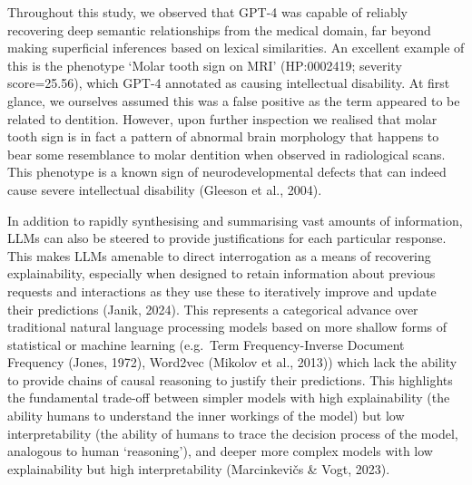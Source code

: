 \documentclass[
]{agujournal2019}
\begin{document}
Throughout this study, we observed that GPT-4 was capable of reliably
recovering deep semantic relationships from the medical domain, far
beyond making superficial inferences based on lexical similarities. An
excellent example of this is the phenotype `Molar tooth sign on MRI'
(HP:0002419; severity score=25.56), which GPT-4 annotated as causing
intellectual disability. At first glance, we ourselves assumed this was
a false positive as the term appeared to be related to dentition.
However, upon further inspection we realised that molar tooth sign is in
fact a pattern of abnormal brain morphology that happens to bear some
resemblance to molar dentition when observed in radiological scans. This
phenotype is a known sign of neurodevelopmental defects that can indeed
cause severe intellectual disability (Gleeson et al., 2004).

In addition to rapidly synthesising and summarising vast amounts of
information, LLMs can also be steered to provide justifications for each
particular response. This makes LLMs amenable to direct interrogation as
a means of recovering explainability, especially when designed to retain
information about previous requests and interactions as they use these
to iteratively improve and update their predictions (Janik, 2024). This
represents a categorical advance over traditional natural language
processing models based on more shallow forms of statistical or machine
learning (e.g.~Term Frequency-Inverse Document Frequency (Jones, 1972),
Word2vec (Mikolov et al., 2013)) which lack the ability to provide
chains of causal reasoning to justify their predictions. This highlights
the fundamental trade-off between simpler models with high
explainability (the ability humans to understand the inner workings of
the model) but low interpretability (the ability of humans to trace the
decision process of the model, analogous to human `reasoning'), and
deeper more complex models with low explainability but high
interpretability (Marcinkevičs \& Vogt, 2023).
\end{document}

